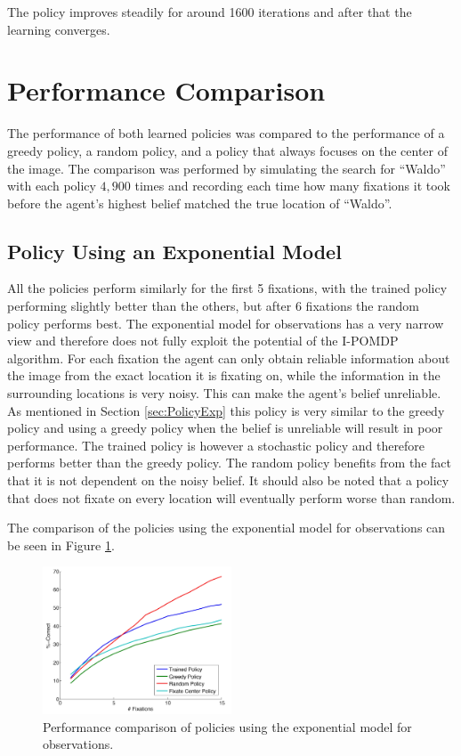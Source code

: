 The policy improves steadily for around 1600 iterations and after that the learning converges.

\section{Performance Comparison}
The performance of both learned policies was compared to the performance of a greedy policy, a random policy, and a policy that always focuses on the center of the image. The comparison was performed by simulating the search for ``Waldo'' with each policy $4,900$ times and recording each time how many fixations it took before the agent's highest belief matched the true location of ``Waldo''.

\subsection{Policy Using an Exponential Model}
All the policies perform similarly for the first 5 fixations, with the trained policy performing slightly better than the others, but after 6 fixations the random policy performs best. The exponential model for observations has a very narrow view and therefore does not fully exploit the potential of the I-POMDP algorithm. For each fixation the agent can only obtain reliable information about the image from the exact location it is fixating on, while the information in the surrounding locations is very noisy. This can make the agent's belief unreliable. As mentioned in Section \ref{sec:PolicyExp} this policy is very similar to the greedy policy and using a greedy policy when the belief is unreliable will result in poor performance. The trained policy is however a stochastic policy and therefore performs better than the greedy policy. The random policy benefits from the fact that it is not dependent on the noisy belief. It should also be noted that a policy that does not fixate on every location will eventually perform worse than random.

The comparison of the policies using the exponential model for observations can be seen in Figure \ref{fig:PolicyComparisonExp}.

\begin{figure}[!htp]
  \centering
  \includegraphics[width=0.5\textwidth]{figures/policy_comparison_exp2}
  \caption{Performance comparison of policies using the exponential model for observations.}
  \label{fig:PolicyComparisonExp}
\end{figure}

